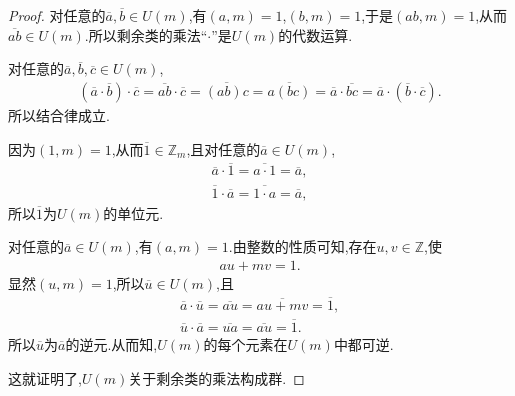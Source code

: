 \documentclass[../../main.tex]{subfiles}%
\begin{document}
\begin{proof}

对任意的$\overline{a},\overline{b} \in U(m)$,有$(a,m)=1$,$(b,m)=1$,于是$(ab,m)=1$,从而$\overline{ab} \in U(m)$.所以剩余类的乘法“$\cdot$”是$U(m)$的代数运算.

对任意的$\overline{a},\overline{b},\overline{c} \in U(m)$,
\begin{align*}
(\overline{a} \cdot \overline{b}) \cdot \overline{c} = \overline{ab} \cdot \overline{c} = \overline{(ab)c} = \overline{a(bc)} = \overline{a} \cdot \overline{bc} = \overline{a} \cdot (\overline{b} \cdot \overline{c}).
\end{align*}
所以结合律成立.

因为$(1,m)=1$,从而$\overline{1} \in \mathbb{Z}_m$,且对任意的$\overline{a} \in U(m)$,
\begin{align*}
\overline{a} \cdot \overline{1} = \overline{a \cdot 1} = \overline{a}, \\
\overline{1} \cdot \overline{a} = \overline{1 \cdot a} = \overline{a},
\end{align*}
所以$\overline{1}$为$U(m)$的单位元.

对任意的$\overline{a} \in U(m)$,有$(a,m)=1$.由整数的性质可知,存在$u,v \in \mathbb{Z}$,使
\begin{align*}
au + mv = 1.
\end{align*}
显然$(u,m)=1$,所以$\overline{u} \in U(m)$,且
\begin{gather*}
\overline{a}\cdot \overline{u}=\overline{au}=\overline{au+mv}=\overline{1},
\\
\overline{u}\cdot \overline{a}=\overline{ua}=\overline{au}=\overline{1}.
\end{gather*}
所以$\overline{u}$为$\overline{a}$的逆元.从而知,$U(m)$的每个元素在$U(m)$中都可逆.

这就证明了,$U(m)$关于剩余类的乘法构成群.

\end{proof}
\end{document}
